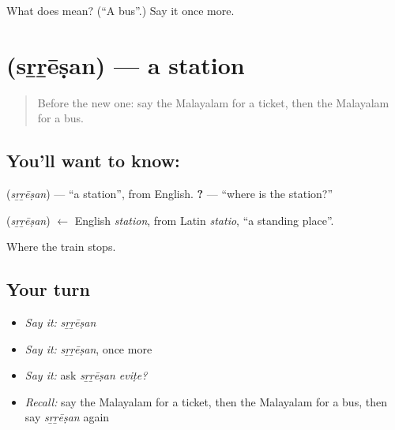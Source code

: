 \begin{tcolorbox}[breakable,colback=teal!4,colframe=teal!35!black,title={Before you move on}]
What does  mean? (\textquotedblleft{}A bus\textquotedblright{}.) Say it once more.
\end{tcolorbox}
\section[\texorpdfstring{\ml{സ്റ്റേഷൻ} (sṟṟēṣan)}{സ്റ്റേഷൻ (sṟṟēṣan)}]{ (sṟṟēṣan) — a station}

\label{lesson:ML-C121-station}



\begin{quote}
Before the new one: say the Malayalam for a ticket, then the Malayalam for a bus.
\end{quote}

\subsection*{You'll want to know: }
\textbf{} (\emph{sṟṟēṣan}) — \textquotedblleft{}a station\textquotedblright{}, from English. \textbf{ ?} — \textquotedblleft{}where is the station?\textquotedblright{}

\begin{cousinweb}
\textbf{} (\emph{sṟṟēṣan}) $\leftarrow$ English \emph{station}, from Latin \emph{statio}, \textquotedblleft{}a standing place\textquotedblright{}.
\end{cousinweb}

\begin{grammarlens}[title={What you've built}]
Where the train stops.
\end{grammarlens}

\subsection*{Your turn}
\begin{itemize}
\raggedright
  \item \emph{Say it:} \emph{sṟṟēṣan}
  \item \emph{Say it:} \emph{sṟṟēṣan}, once more
  \item \emph{Say it:} ask \emph{sṟṟēṣan eviṭe?}
  \item \emph{Recall:} say the Malayalam for a ticket, then the Malayalam for a bus, then say \emph{sṟṟēṣan} again
\end{itemize}


